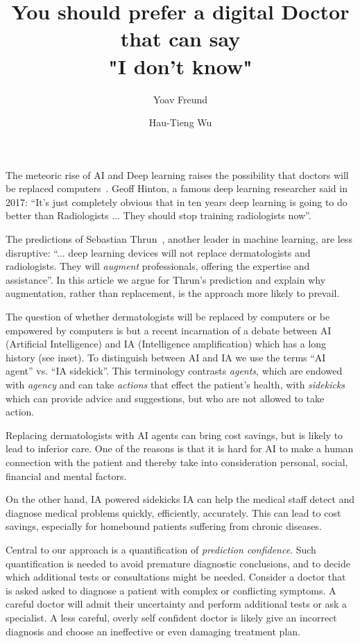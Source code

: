 \documentclass[11pt]{pnas-new}
\author[1]{Yoav Freund}
\author[2]{Hau-Tieng Wu}
\affil[1]{UCSD, Computer Science, San Diego, 92093, United States}
\affil[2]{Duke, department, city, postcode, country}
\title{You should prefer a digital Doctor that can say\\ "I don't know"}
\newlength{\strutheight}
\begin{document}
\settoheight{\strutheight}{\strut}

 
\maketitle


The meteoric rise of AI and Deep learning raises the possibility that
doctors will be replaced computers~\cite{Mukherjee2017}. Geoff Hinton,
a famous deep learning researcher said in 2017: ``It's just completely
obvious that in ten years deep learning is going to do better than
Radiologists ... They should stop training radiologists now''.

The predictions of Sebastian
Thrun~\cite{Mukherjee2017,esteva2017dermatologist}, another leader in
machine learning, are less disruptive: ``... deep learning devices
will not replace dermatologists and radiologists. They will {\em
  augment} professionals, offering the expertise and assistance''. In
this article we argue for Thrun's prediction and explain why
augmentation, rather than replacement, is the approach more likely to
prevail.

 The question of whether dermatologists will be
replaced by computers or be empowered by computers is but a recent
incarnation of a debate between AI (Artificial Intelligence) and IA
(Intelligence amplification) which has a long history (see inset). To
distinguish between AI and IA we use the terms ``AI agent'' vs. ``IA
sidekick''. This terminology contrasts {\em agents}, which are endowed
with {\em agency} and can take {\em actions} that effect the patient's
health, with {\em sidekicks} which can provide advice and suggestions,
but who are not allowed to take action.

Replacing dermatologists with AI agents can bring cost savings,
but is likely to lead to inferior care. One of the reasons is that it
is hard for AI to make a human connection with the patient and thereby
take into consideration personal, social, financial and mental factors.

On the other hand, IA powered sidekicks IA can help the medical staff
detect and diagnose medical problems quickly, efficiently,
accurately. This can lead to cost savings, especially for homebound
patients suffering from chronic diseases.

Central to our approach is a quantification of {\em prediction
  confidence}. Such quantification is needed to avoid premature
diagnostic conclusions, and to decide which additional tests or
consultations might be needed. Consider a doctor that is asked asked
to diagnose a patient with complex or conflicting symptoms. A careful
doctor will admit their uncertainty and perform additional tests or
ask a specialist. A less careful, overly self confident doctor is
likely give an incorrect diagnosis and choose an ineffective or even damaging
treatment plan.
\end{document}
